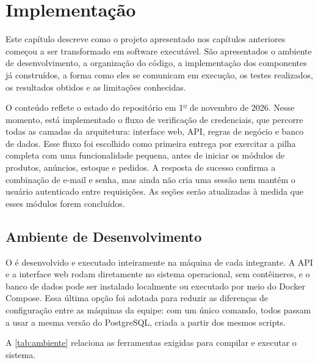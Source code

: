 \chapter{Implementação}
\label{cap:implementacao}

Este capítulo descreve como o projeto apresentado nos capítulos anteriores começou a ser transformado em software executável. São apresentados o ambiente de desenvolvimento, a organização do código, a implementação dos componentes já construídos, a forma como eles se comunicam em execução, os testes realizados, os resultados obtidos e as limitações conhecidas.

O conteúdo reflete o estado do repositório em 1º de novembro de 2026. Nesse momento, está implementado o fluxo de verificação de credenciais, que percorre todas as camadas da arquitetura: interface web, API, regras de negócio e banco de dados. Esse fluxo foi escolhido como primeira entrega por exercitar a pilha completa com uma funcionalidade pequena, antes de iniciar os módulos de produtos, anúncios, estoque e pedidos. A resposta de sucesso confirma a combinação de e-mail e senha, mas ainda não cria uma sessão nem mantém o usuário autenticado entre requisições. As seções serão atualizadas à medida que esses módulos forem concluídos.

\section{Ambiente de Desenvolvimento}
\label{sec:ambiente}

O \sistema{} é desenvolvido e executado inteiramente na máquina de cada integrante. A API e a interface web rodam diretamente no sistema operacional, sem contêineres, e o banco de dados pode ser instalado localmente ou executado por meio do Docker Compose. Essa última opção foi adotada para reduzir as diferenças de configuração entre as máquinas da equipe: com um único comando, todos passam a usar a mesma versão do PostgreSQL, criada a partir dos mesmos scripts.

A \autoref{tab:ambiente} relaciona as ferramentas exigidas para compilar e executar o sistema.


